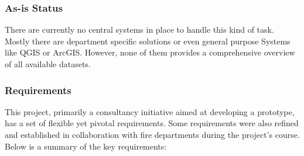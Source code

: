 \documentclass[11pt, titlepage, a4paper]{article}
\begin{document}
\subsubsection{As-is Status}
There are currently no central systems in place to handle this kind of task. Mostly there are department specific solutions or even general purpose Systems like QGIS or ArcGIS. However, none of them provides a comprehensive overview of all available datasets.

\subsubsection{Requirements}
This project, primarily a consultancy initiative aimed at developing a prototype, has a set of flexible yet pivotal requirements. Some requirements were also refined and established in collaboration with fire departments during the project's course. Below is a summary of the key requirements:
\end{document}
